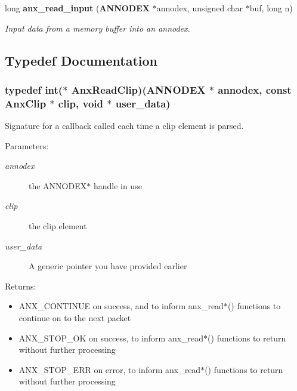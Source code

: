 \begin{CompactItemize}
long {\bf anx\_\-read\_\-input} ({\bf ANNODEX} $\ast$annodex, unsigned char $\ast$buf, long n)
\begin{CompactList}\small\item\em Input data from a memory buffer into an annodex. \item\end{CompactList}\end{CompactItemize}


\subsection{Typedef Documentation}
\subsubsection{\setlength{\rightskip}{0pt plus 5cm}typedef int($\ast$ {\bf Anx\-Read\-Clip})({\bf ANNODEX} $\ast$ annodex, const Anx\-Clip $\ast$ clip, void $\ast$ user\_\-data)}\label{anx__read_8h_a3}


Signature for a callback called each time a clip element is parsed. 

\begin{Desc}
\item[Parameters:]
\begin{description}
\item[{\em annodex}]the ANNODEX$\ast$ handle in use \item[{\em clip}]the clip element \item[{\em user\_\-data}]A generic pointer you have provided earlier \end{description}
\end{Desc}
\begin{Desc}
\item[Returns:]\begin{itemize}
\item ANX\_\-CONTINUE on success, and to inform anx\_\-read$\ast$() functions to continue on to the next packet\item ANX\_\-STOP\_\-OK on success, to inform anx\_\-read$\ast$() functions to return without further processing\item ANX\_\-STOP\_\-ERR on error, to inform anx\_\-read$\ast$() functions to return without further processing \end{itemize}
\end{Desc}
